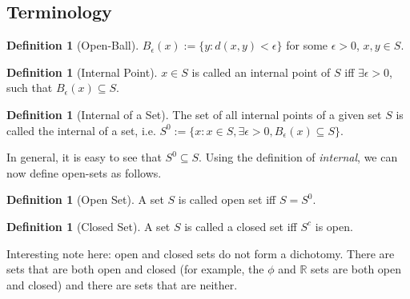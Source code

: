 \documentclass{report}
\theoremstyle{plain}
\theoremstyle{definition}
\newtheorem{definition}[theorem]{Definition} %
\begin{document}
\subsection{Terminology}
\begin{definition}[Open-Ball]
$B_\epsilon(x):=\{y : d(x,y)<\epsilon\}$ for some $\epsilon>0$, $x,y\in S$.
\end{definition}
\begin{definition}[Internal Point]
$x\in S$ is called an internal point of $S$ iff $\exists \epsilon>0$, such that $B_\epsilon(x)\subseteq S$.
\end{definition}
\begin{definition}[Internal of a Set]
The set of all internal points of a given set $S$ is called the internal of a set, i.e. $S^0:=\{x : x\in S, \exists \epsilon>0, B_\epsilon(x)\subseteq S\}$.
\end{definition}
\noindent In general, it is easy to see that $S^0\subseteq S$. Using the definition of \emph{internal}, we can now define open-sets as follows.
\begin{definition}[Open Set]
A set $S$ is called open set iff $S=S^0$.
\end{definition}
\begin{definition}[Closed Set]
A set $S$ is called a closed set iff $S^c$ is open.
\end{definition}
\noindent Interesting note here: open and closed sets do not form a dichotomy. There are sets that are both open and closed (for example, the $\phi$ and $\mathbb{R}$ sets are both open and closed) and there are sets that are neither.
\end{document}
